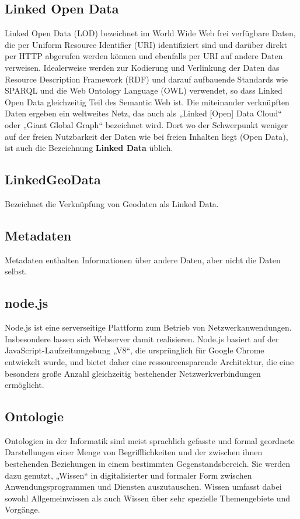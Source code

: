 \documentclass[11pt,a4paper]{article}
\begin{document}
\subsection{Linked Open Data}
Linked Open Data (LOD) bezeichnet im World Wide Web frei verfügbare Daten, die per Uniform Resource Identifier (URI) identifiziert sind und darüber direkt per HTTP abgerufen werden können und ebenfalls per URI auf andere Daten verweisen. Idealerweise werden zur Kodierung und Verlinkung der Daten das Resource Description Framework (RDF) und darauf aufbauende Standards wie SPARQL und die Web Ontology Language (OWL) verwendet, so dass Linked Open Data gleichzeitig Teil des Semantic Web ist. Die miteinander verknüpften Daten ergeben ein weltweites Netz, das auch als „Linked [Open] Data Cloud“ oder „Giant Global Graph“ bezeichnet wird. Dort wo der Schwerpunkt weniger auf der freien Nutzbarkeit der Daten wie bei freien Inhalten liegt (Open Data), ist auch die Bezeichnung \textbf{Linked Data} üblich.\subsection{LinkedGeoData}
Bezeichnet die Verknüpfung von Geodaten als Linked Data.
\subsection{Metadaten}
Metadaten enthalten Informationen über andere Daten, aber nicht die Daten selbst.
\subsection{node.js}
Node.js ist eine serverseitige Plattform zum Betrieb von Netzwerkanwendungen. Insbesondere lassen sich Webserver damit realisieren. Node.js basiert auf der JavaScript-Laufzeitumgebung „V8“, die ursprünglich für Google Chrome entwickelt wurde, und bietet daher eine ressourcensparende Architektur, die eine besonders große Anzahl gleichzeitig bestehender Netzwerkverbindungen ermöglicht.
\subsection{Ontologie}
Ontologien in der Informatik  sind meist sprachlich gefasste und formal geordnete Darstellungen einer  Menge von Begrifflichkeiten und der zwischen ihnen bestehenden  Beziehungen in einem bestimmten Gegenstandsbereich. Sie werden dazu  genutzt, „Wissen“ in digitalisierter und formaler Form zwischen Anwendungsprogrammen  und Diensten auszutauschen. Wissen umfasst dabei sowohl Allgemeinwissen  als auch Wissen über sehr spezielle Themengebiete und Vorgänge.
\end{document}
